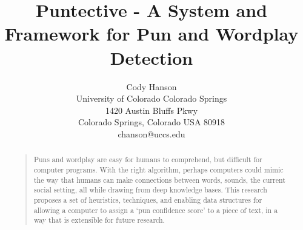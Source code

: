 \documentclass[letterpaper]{article}
\begin{document}
\title{Puntective - A System and Framework for Pun and Wordplay Detection}
\author{Cody Hanson\\
University of Colorado Colorado Springs\\
1420 Austin Bluffs Pkwy\\
Colorado Springs, Colorado USA 80918\\
chanson@uccs.edu}
\maketitle
\begin{abstract}
\begin{quote}
Puns and wordplay are easy for humans to comprehend, but difficult for computer programs.
With the right algorithm, perhaps computers could mimic the way that humans can make connections between words, sounds, the current social setting, all while drawing from deep knowledge bases. 
This research proposes a set of heuristics, techniques, and enabling data structures for allowing a computer to assign a `pun confidence score' to a piece of text, in a way that is extensible for future research.
\end{quote}
\end{abstract}









 

\end{document}

